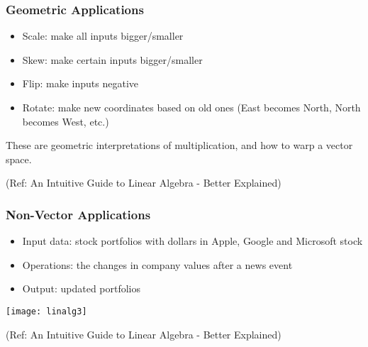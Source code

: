 \begin{frame}[fragile]\frametitle{Geometric Applications}

 \begin{itemize}
  \item Scale: make all inputs bigger/smaller
  \item Skew: make certain inputs bigger/smaller
  \item Flip: make inputs negative
  \item Rotate: make new coordinates based on old ones (East becomes North, North becomes West, etc.)
 \end{itemize}

These are geometric interpretations of multiplication, and how to warp a vector space. 

{\tiny (Ref: An Intuitive Guide to Linear Algebra - Better Explained)}

\end{frame}

\begin{frame}[fragile]\frametitle{Non-Vector Applications}

 \begin{itemize}
  \item Input data: stock portfolios with dollars in Apple, Google and Microsoft stock
  \item Operations: the changes in company values after a news event
  \item Output: updated portfolios
 \end{itemize}

\begin{center}
\texttt{[image: linalg3]}
\end{center}


{\tiny (Ref: An Intuitive Guide to Linear Algebra - Better Explained)}

\end{frame}

